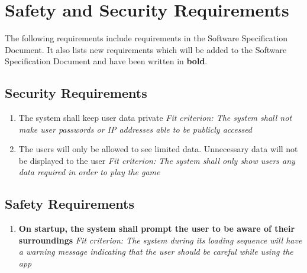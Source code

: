\documentclass{article}
\begin{document}
\section{Safety and Security Requirements}

The following requirements include requirements in the Software Specification
Document. It also lists new requirements which will be added to the Software
Specification Document and have been written in \textbf{bold}.

\subsection{Security Requirements}
\begin{enumerate}[SR\arabic*.]
    \item The system shall keep user data private\newline
    \textit{Fit criterion: The system shall not make user passwords or IP addresses able to be publicly accessed}
    \item The users will only be allowed to see limited data. Unnecessary data will not be displayed to the user\newline
    \textit{Fit criterion: The system shall only show users any data required in order to play the game}

\end{enumerate}

\subsection{Safety Requirements}
\begin{enumerate}
    \item \textbf{On startup, the system shall prompt the user to be aware of their surroundings}\newline
    \textit{Fit criterion: The system during its loading sequence will have a warning message indicating that the user should be careful while using the app}
\end{enumerate}
\end{document}
